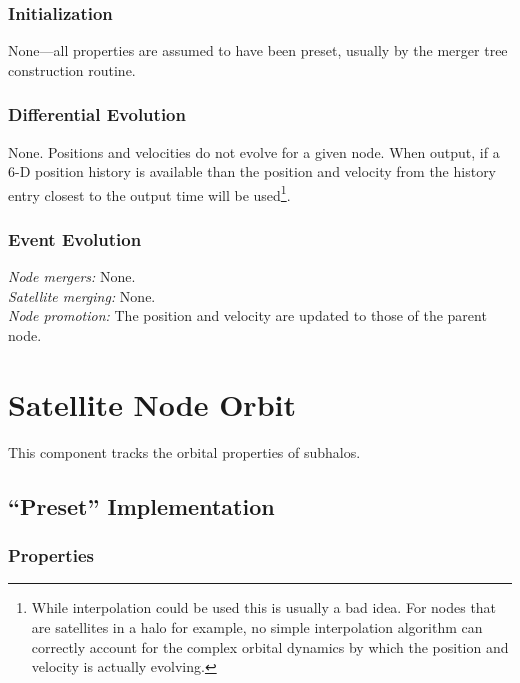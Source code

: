 \subsubsection{Initialization}

None---all properties are assumed to have been preset, usually by the merger tree construction routine.

\subsubsection{Differential Evolution}

None. Positions and velocities do not evolve for a given node. When output, if a 6-D position history is available than the position and velocity from the history entry closest to the output time will be used\footnote{While interpolation could be used this is usually a bad idea. For nodes that are satellites in a halo for example, no simple interpolation algorithm can correctly account for the complex orbital dynamics by which the position and velocity is actually evolving.}.

\subsubsection{Event Evolution}

\noindent\emph{Node mergers:} None.\\

\noindent\emph{Satellite merging:} None.\\

\noindent\emph{Node promotion:} The position and velocity are updated to those of the parent node.\\

\section{Satellite Node Orbit}

This \gls{component} tracks the orbital properties of subhalos.

\subsection{``Preset'' Implementation}

\subsubsection{Properties}

